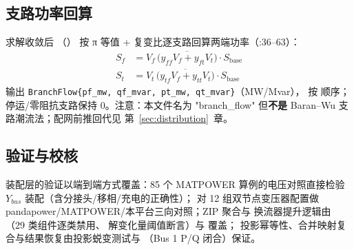 \subsection{支路功率回算}
求解收敛后 （）
按 π 等值 + 复变比逐支路回算两端功率（:36--63）：
\begin{align*}
S_f &= V_f\,\overline{\big(y_{ff}V_f+y_{ft}V_t\big)}\cdot S_{\mathrm{base}}\\
S_t &= V_t\,\overline{\big(y_{tf}V_f+y_{tt}V_t\big)}\cdot S_{\mathrm{base}}
\end{align*}
输出 \texttt{BranchFlow\{pf\_mw, qf\_mvar, pt\_mw, qt\_mvar\}}（MW/Mvar），
按  顺序；停运/零阻抗支路保持 0。注意：本文件名为
"branch\_flow" 但\textbf{不是} Baran--Wu 支路潮流法；配网前推回代见
第~\ref{sec:distribution}~章。

\subsection{验证与校核}
装配层的验证以端到端方式覆盖：85 个 MATPOWER 算例的电压对照直接检验 $Y_{bus}$
装配（含分接头/移相/充电的正确性）；
对 12 组双节点变压器配置做 pandapower/MATPOWER/本平台三向对照；ZIP 聚合与
换流器提升逻辑由 （29 类组件逐类禁用、
解变化量阈值断言）与  覆盖；
投影幂等性、合并映射复合与结果恢复由投影蜕变测试与
（Bus 1 P/Q 闭合）保证。

